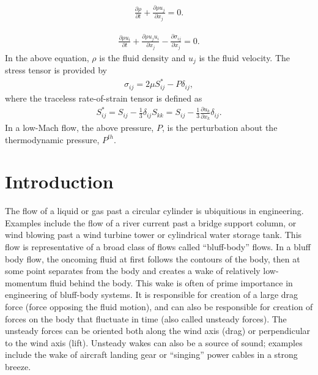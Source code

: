 \documentclass{article}
\begin{document}
\begin{align}
  \frac {\partial \rho }{\partial t} + \frac{ \partial \rho u_j}{\partial x_j} = 0.
\label{eq:contEq}
\end{align} 

\begin{align}
  \frac {\partial \rho u_i }{\partial t} + \frac{ \partial \rho u_j u_i}{\partial x_j} 
-\frac{\partial \sigma_{ij}}{\partial x_j} = 0.
\label{eq:momEq}
\end{align}
%
In the above equation, $\rho$ is the fluid density and $u_j$ is the fluid velocity. 
The stress tensor is provided by
\begin{align}
\sigma_{ij}  = 2 \mu S^*_{ij} - P \delta_{ij},
\end{align}
%
where the traceless rate-of-strain tensor is defined as
\begin{align}
S^*_{ij}  = S_{ij} - \frac{1}{3} \delta_{ij} S_{kk} \nonumber
		     = S_{ij} - \frac{1}{3} \frac{\partial  u_k }{\partial x_k}\delta_{ij}.
\end{align}
In a low-Mach flow, the above pressure, $P$, is the perturbation about the thermodynamic
pressure, $P^{th}$. 

\section*{Introduction}
The flow of a liquid or gas past a circular cylinder is ubiquitious in
engineering.  Examples include the flow of a river current past a
bridge support column, or wind blowing past a wind turbine tower or
cylindrical water storage tank.  This flow is representative of a
broad class of flows called ``bluff-body'' flows. In a bluff body
flow, the oncoming fluid at first follows the contours of the body,
then at some point separates from the body and creates a wake of
relatively low-momentum fluid behind the body.  This wake is often of
prime importance in engineering of bluff-body systems.  It is
responsible for creation of a large drag force (force opposing the
fluid motion), and can also be responsible for creation of forces on
the body that fluctuate in time (also called unsteady forces).  The
unsteady forces can be oriented both along the wind axis (drag) or
perpendicular to the wind axis (lift).  Unsteady wakes can also be a
source of sound; examples include the wake of aircraft landing gear or
``singing'' power cables in a strong breeze.
\end{document}
